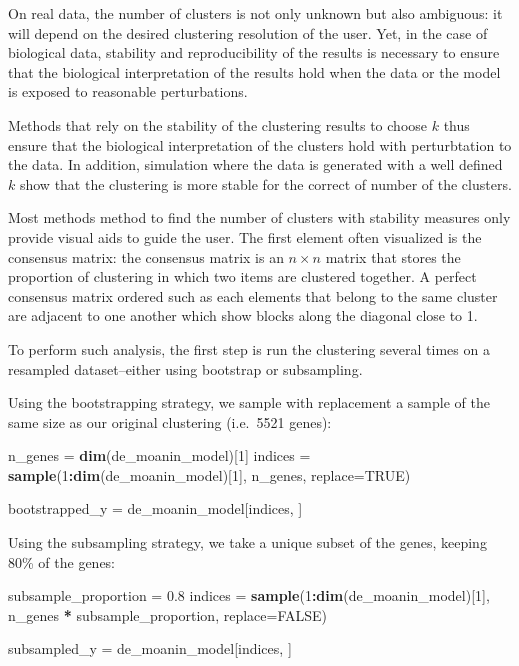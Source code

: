 \documentclass[9pt,a4paper,]{extarticle}
\newenvironment{Shaded}{\begin{snugshade}}{\end{snugshade}}
\newcommand{\DataTypeTok}[1]{\textcolor[rgb]{0.13,0.29,0.53}{#1}}
\newcommand{\DecValTok}[1]{\textcolor[rgb]{0.00,0.00,0.81}{#1}}
\newcommand{\FloatTok}[1]{\textcolor[rgb]{0.00,0.00,0.81}{#1}}
\newcommand{\KeywordTok}[1]{\textcolor[rgb]{0.13,0.29,0.53}{\textbf{#1}}}
\newcommand{\NormalTok}[1]{#1}
\newcommand{\OperatorTok}[1]{\textcolor[rgb]{0.81,0.36,0.00}{\textbf{#1}}}
\newcommand{\OtherTok}[1]{\textcolor[rgb]{0.56,0.35,0.01}{#1}}
\newcommand{\StringTok}[1]{\textcolor[rgb]{0.31,0.60,0.02}{#1}}
\begin{document}
On real data, the number of clusters is not only unknown but also
ambiguous: it will depend on the desired clustering resolution of the user.
Yet, in the case of biological data, stability and reproducibility of the
results is necessary to ensure that the biological interpretation of the
results hold when the data or the model is exposed to reasonable
perturbations.

Methods that rely on the stability of the clustering results to choose \(k\)
thus ensure that the biological interpretation of the clusters hold with
perturbtation to the data. In addition, simulation where the data is generated
with a well defined \(k\) show that the clustering is more stable for the
correct of number of the clusters.

Most methods method to find the number of clusters with stability measures
only provide visual aids to guide the user. The first element often visualized
is the consensus matrix: the consensus matrix is an \(n \times n\) matrix that
stores the proportion of clustering in which two items are clustered together.
A perfect consensus matrix ordered such as each elements that belong to the
same cluster are adjacent to one another which show blocks along the diagonal
close to 1.

To perform such analysis, the first step is run the clustering several times
on a resampled dataset--either using bootstrap or subsampling.

Using the bootstrapping strategy, we sample with replacement a sample of the
same size as our original clustering (i.e.~5521 genes):

\begin{Shaded}
\begin{Highlighting}[]
\NormalTok{n_genes =}\StringTok{ }\KeywordTok{dim}\NormalTok{(de_moanin_model)[}\DecValTok{1}\NormalTok{]}
\NormalTok{indices =}\StringTok{ }\KeywordTok{sample}\NormalTok{(}\DecValTok{1}\OperatorTok{:}\KeywordTok{dim}\NormalTok{(de_moanin_model)[}\DecValTok{1}\NormalTok{], n_genes, }\DataTypeTok{replace=}\OtherTok{TRUE}\NormalTok{)}

\NormalTok{bootstrapped_y =}\StringTok{ }\NormalTok{de_moanin_model[indices, ]}
\end{Highlighting}
\end{Shaded}

Using the subsampling strategy, we take a unique subset of the genes, keeping 80\% of the genes:

\begin{Shaded}
\begin{Highlighting}[]
\NormalTok{subsample_proportion =}\StringTok{ }\FloatTok{0.8}
\NormalTok{indices =}\StringTok{ }\KeywordTok{sample}\NormalTok{(}\DecValTok{1}\OperatorTok{:}\KeywordTok{dim}\NormalTok{(de_moanin_model)[}\DecValTok{1}\NormalTok{], n_genes }\OperatorTok{*}\StringTok{ }\NormalTok{subsample_proportion, }\DataTypeTok{replace=}\OtherTok{FALSE}\NormalTok{)}

\NormalTok{subsampled_y =}\StringTok{ }\NormalTok{de_moanin_model[indices, ]}
\end{Highlighting}
\end{Shaded}
\end{document}
